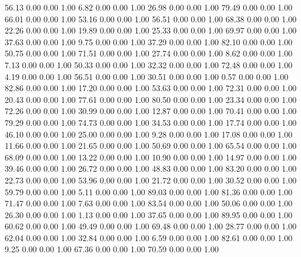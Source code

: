    56.13   0.00   0.00   1.00
    6.82   0.00   0.00   1.00
   26.98   0.00   0.00   1.00
   79.49   0.00   0.00   1.00
   66.01   0.00   0.00   1.00
   53.16   0.00   0.00   1.00
   56.51   0.00   0.00   1.00
   68.38   0.00   0.00   1.00
   22.26   0.00   0.00   1.00
   19.89   0.00   0.00   1.00
   25.33   0.00   0.00   1.00
   69.97   0.00   0.00   1.00
   37.63   0.00   0.00   1.00
    9.75   0.00   0.00   1.00
   37.29   0.00   0.00   1.00
   82.10   0.00   0.00   1.00
   50.75   0.00   0.00   1.00
   71.51   0.00   0.00   1.00
   27.74   0.00   0.00   1.00
    8.62   0.00   0.00   1.00
    7.13   0.00   0.00   1.00
   50.33   0.00   0.00   1.00
   32.32   0.00   0.00   1.00
   72.48   0.00   0.00   1.00
    4.19   0.00   0.00   1.00
   56.51   0.00   0.00   1.00
   30.51   0.00   0.00   1.00
    0.57   0.00   0.00   1.00
   82.86   0.00   0.00   1.00
   17.20   0.00   0.00   1.00
   53.63   0.00   0.00   1.00
   72.31   0.00   0.00   1.00
   20.43   0.00   0.00   1.00
   77.61   0.00   0.00   1.00
   80.50   0.00   0.00   1.00
   23.34   0.00   0.00   1.00
   72.26   0.00   0.00   1.00
   30.99   0.00   0.00   1.00
   12.87   0.00   0.00   1.00
   70.41   0.00   0.00   1.00
   79.29   0.00   0.00   1.00
   74.73   0.00   0.00   1.00
   34.53   0.00   0.00   1.00
   17.74   0.00   0.00   1.00
   46.10   0.00   0.00   1.00
   25.00   0.00   0.00   1.00
    9.28   0.00   0.00   1.00
   17.08   0.00   0.00   1.00
   11.66   0.00   0.00   1.00
   21.65   0.00   0.00   1.00
   50.69   0.00   0.00   1.00
   65.54   0.00   0.00   1.00
   68.09   0.00   0.00   1.00
   13.22   0.00   0.00   1.00
   10.90   0.00   0.00   1.00
   14.97   0.00   0.00   1.00
   39.46   0.00   0.00   1.00
   26.72   0.00   0.00   1.00
   48.83   0.00   0.00   1.00
   83.20   0.00   0.00   1.00
   22.73   0.00   0.00   1.00
   53.96   0.00   0.00   1.00
   21.72   0.00   0.00   1.00
   30.52   0.00   0.00   1.00
   59.79   0.00   0.00   1.00
    5.11   0.00   0.00   1.00
   89.03   0.00   0.00   1.00
   81.36   0.00   0.00   1.00
   71.47   0.00   0.00   1.00
    7.63   0.00   0.00   1.00
   83.54   0.00   0.00   1.00
   50.06   0.00   0.00   1.00
   26.30   0.00   0.00   1.00
    1.13   0.00   0.00   1.00
   37.65   0.00   0.00   1.00
   89.95   0.00   0.00   1.00
   60.62   0.00   0.00   1.00
   49.49   0.00   0.00   1.00
   69.48   0.00   0.00   1.00
   28.77   0.00   0.00   1.00
   62.04   0.00   0.00   1.00
   32.84   0.00   0.00   1.00
    6.59   0.00   0.00   1.00
   82.61   0.00   0.00   1.00
    9.25   0.00   0.00   1.00
   67.36   0.00   0.00   1.00
   70.59   0.00   0.00   1.00
